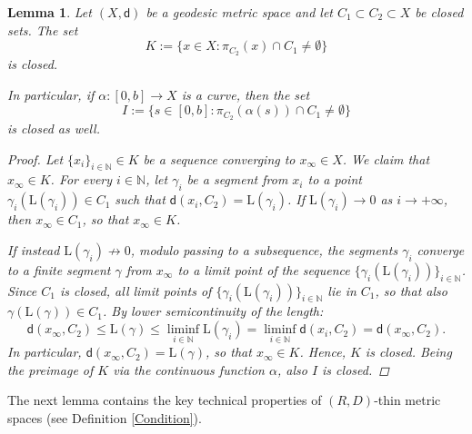 \documentclass[10pt]{article}
\newtheorem{lemma}[thm]{Lemma}
\theoremstyle{definition}
\newcommand{\bb}[1]{\mathbb{#1}}
\newcommand{\length}{\mathrm{L}}
\newcommand{\sd}{\mathsf{d}}
\begin{document}
\begin{lemma} \label{L20}
Let $(X,\sd)$ be a geodesic metric space and let $C_1 \subset C_2 \subset X$ be closed sets. The set
\[
    K:=\{ x \in X:  \pi_{C_2}(x) \cap  C_1 \neq \emptyset\}
    \]
    is closed.
    
In particular, if $\alpha:[0,b] \to X$ is a curve, then
the set
    \[
    I:=\{ s \in [0,b]: \pi_{C_2}(\alpha(s)) \cap C_1 \neq \emptyset\}
    \]
    is closed as well.
    \begin{proof}
        Let $\{x_i\}_{i \in \bb{N}} \in K$ be a sequence converging to $x_\infty \in X$. We claim that $x_\infty \in K$. 
        For every $i \in \bb{N}$, let $\gamma_i$ be a segment from $x_i$ to a point $\gamma_i(\length(\gamma_i)) \in C_1$ such that $\sd(x_i,C_2)=\length(\gamma_i)$.
 If $\length(\gamma_i) \to 0$ as $i \to + \infty$, then $x_\infty \in C_1$, so that $x_\infty \in K$.

        If instead $\length(\gamma_i)\not \to 0$, modulo passing to a subsequence, the segments $\gamma_i$ converge to a finite segment $\gamma$ from $x_\infty$ to a limit point of the sequence $\{\gamma_i(\length(\gamma_i))\}_{i \in \bb{N}}$. Since $C_1$ is closed, all limit points of  $\{\gamma_i(\length(\gamma_i))\}_{i \in \bb{N}}$ lie in $C_1$, so that also $\gamma(\length(\gamma)) \in C_1$. By lower semicontinuity of the length:
        \begin{equation*}
        \sd(x_\infty,C_2) \leq \length(\gamma) \leq \liminf_{i \in \bb{N}} \length(\gamma_i) =
        \liminf_{i \in \bb{N}} \sd(x_i,C_2)=
        \sd(x_\infty,C_2).
        \end{equation*}
        In particular,
        $\sd(x_\infty,C_2) =\length(\gamma)$, so that $x_\infty \in K$. Hence, $K$ is closed.
Being the preimage of $K$ via the continuous function $\alpha$, also $I$ is closed.
    \end{proof}
\end{lemma}

The next lemma contains the key technical properties of $(R,D)$-thin metric spaces (see Definition \ref{Condition}).
\end{document}
